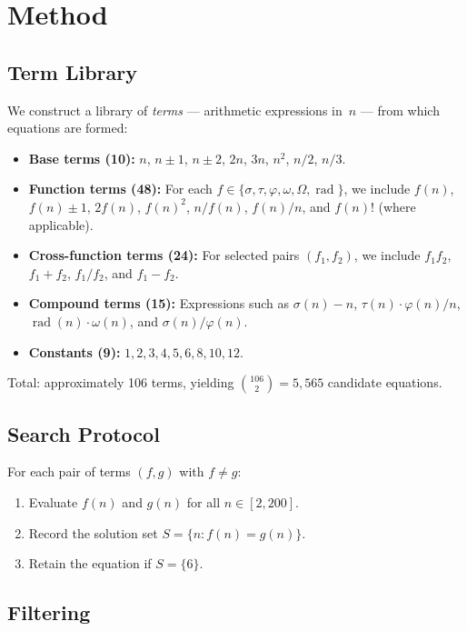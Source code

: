 \documentclass{article}
\newcommand{\rad}{\operatorname{rad}}
\begin{document}
\section{Method}

\subsection{Term Library}

We construct a library of \emph{terms} --- arithmetic expressions in~$n$ --- from which equations are formed:

\begin{itemize}
\item \textbf{Base terms (10):} $n$, $n \pm 1$, $n \pm 2$, $2n$, $3n$, $n^2$, $n/2$, $n/3$.
\item \textbf{Function terms (48):} For each $f \in \{\sigma, \tau, \varphi, \omega, \Omega, \rad\}$, we include $f(n)$, $f(n) \pm 1$, $2f(n)$, $f(n)^2$, $n/f(n)$, $f(n)/n$, and $f(n)!$ (where applicable).
\item \textbf{Cross-function terms (24):} For selected pairs $(f_1, f_2)$, we include $f_1 f_2$, $f_1 + f_2$, $f_1/f_2$, and $f_1 - f_2$.
\item \textbf{Compound terms (15):} Expressions such as $\sigma(n) - n$, $\tau(n) \cdot \varphi(n)/n$, $\rad(n) \cdot \omega(n)$, and $\sigma(n)/\varphi(n)$.
\item \textbf{Constants (9):} $1, 2, 3, 4, 5, 6, 8, 10, 12$.
\end{itemize}

Total: approximately 106 terms, yielding $\binom{106}{2} = 5{,}565$ candidate equations.

\subsection{Search Protocol}

For each pair of terms $(f, g)$ with $f \neq g$:
\begin{enumerate}
\item Evaluate $f(n)$ and $g(n)$ for all $n \in [2, 200]$.
\item Record the solution set $S = \{n : f(n) = g(n)\}$.
\item Retain the equation if $S = \{6\}$.
\end{enumerate}

\subsection{Filtering}
\end{document}

